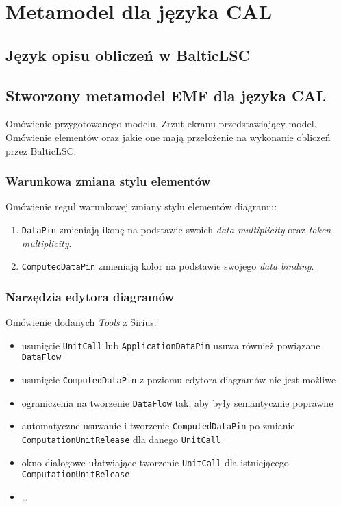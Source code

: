 \chapter{Metamodel dla języka CAL}

\section{Język opisu obliczeń w BalticLSC}

\section{Stworzony metamodel EMF dla języka CAL}

Omówienie przygotowanego modelu. Zrzut ekranu przedstawiający model. Omówienie
elementów oraz jakie one mają przełożenie na wykonanie obliczeń przez
BalticLSC\@.

\subsection{Warunkowa zmiana stylu elementów}

Omówienie reguł warunkowej zmiany stylu elementów diagramu:

\begin{enumerate}
	\item \texttt{DataPin} zmieniają ikonę na podstawie swoich \textit{data
		      multiplicity} oraz \textit{token multiplicity}.
	\item \texttt{ComputedDataPin} zmieniają kolor na podstawie swojego
	      \textit{data binding}.
\end{enumerate}

\subsection{Narzędzia edytora diagramów}

Omówienie dodanych \textit{Tools} z Sirius:

\begin{itemize}
	\item usunięcie \texttt{UnitCall} lub \texttt{ApplicationDataPin} usuwa również powiązane \texttt{DataFlow}
	\item usunięcie \texttt{ComputedDataPin} z poziomu edytora diagramów nie jest możliwe
	\item ograniczenia na tworzenie \texttt{DataFlow} tak, aby były semantycznie poprawne
	\item automatyczne usuwanie i tworzenie \texttt{ComputedDataPin} po zmianie \texttt{ComputationUnitRelease} dla danego \texttt{UnitCall}
	\item okno dialogowe ułatwiające tworzenie \texttt{UnitCall} dla istniejącego \texttt{ComputationUnitRelease}
	\item \ldots
\end{itemize}

